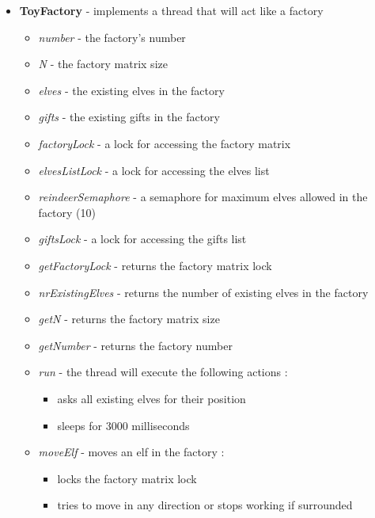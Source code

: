 \documentclass{article}
\begin{document}
\begin{itemize}
\begin{itemize}
            \end{itemize}
        
        \item \textbf{ToyFactory} - implements a thread that will act like a factory
            \begin{itemize}
                \item \textit{number} - the factory's number
                \item \textit{N} - the factory matrix size
                \item \textit{elves} - the existing elves in the factory
                \item \textit{gifts} - the existing gifts in the factory
                \item \textit{factoryLock} -  a lock for accessing the factory matrix
                \item \textit{elvesListLock} - a lock for accessing the elves list
                \item \textit{reindeerSemaphore} - a semaphore for maximum elves allowed in the factory (10)
                \item \textit{giftsLock} - a lock for accessing the gifts list
                \item \textit{getFactoryLock} - returns the factory matrix lock
                \item \textit{nrExistingElves} - returns the number of existing elves in the factory
                \item \textit{getN} - returns the factory matrix size
                \item \textit{getNumber} - returns the factory number
                \item \textit{run} - the thread will execute the following actions :
                    \begin{itemize}
                        \item asks all existing elves for their position
                        \item sleeps for 3000 milliseconds
                    \end{itemize}
                \item \textit{moveElf} - moves an elf in the factory :
                    \begin{itemize}
                        \item locks the factory matrix lock
                        \item tries to move in any direction or stops working if surrounded

\end{itemize}
\end{itemize}
\end{itemize}
\end{document}
